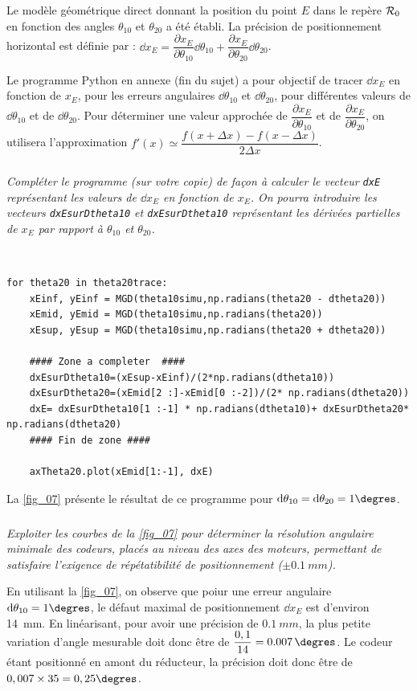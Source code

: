 \documentclass[10pt,fleqn]{article} %
\begin{document}
Le modèle géométrique direct donnant la position du point $E$ dans le repère $\mathcal{R}_{0}$  en fonction des angles $\theta_{10}$ et
$\theta_{20}$ a été établi. La précision de positionnement horizontal est définie par :
$\dd x_E = \dfrac{\partial x_E}{\partial \theta_{10}} \dd \theta_{10}
+ \dfrac{\partial x_E}{\partial \theta_{20}} \dd \theta_{20}$.


Le programme Python en annexe (fin du sujet) a pour objectif de tracer $\dd x_E$ en fonction de $x_E$, pour les erreurs angulaires $\dd \theta_{10}$ et $\dd \theta_{20}$, pour différentes valeurs de $\dd \theta_{10}$ et de $\dd \theta_{20}$.
Pour déterminer une valeur approchée de $\dfrac{\partial x_E}{\partial \theta_{10}}$
et de $\dfrac{\partial x_E}{\partial \theta_{20}}$, on utilisera l’approximation 
$f'\left(x\right)\simeq \dfrac{f\left(x+\Delta x\right)-f\left(x-\Delta x\right)}{2\Delta x}$.

\fi

\subparagraph{\label{q}}\textit{Compléter le programme (sur votre copie) de façon à calculer le vecteur \texttt{dxE} représentant les valeurs de $\dd x_E$ en fonction de $x_E$. On pourra introduire les vecteurs \texttt{dxEsurDtheta10} et \texttt{dxEsurDtheta10}
représentant les dérivées partielles de $x_E$ par rapport à $\theta_{10}$ et $\theta_{20}$.}
\ifprof
\begin{corrige}~\\

\begin{lstlisting}
for theta20 in theta20trace:
    xEinf, yEinf = MGD(theta10simu,np.radians(theta20 - dtheta20))
    xEmid, yEmid = MGD(theta10simu,np.radians(theta20))
    xEsup, yEsup = MGD(theta10simu,np.radians(theta20 + dtheta20))
    
    #### Zone a completer  ####
    dxEsurDtheta10=(xEsup-xEinf)/(2*np.radians(dtheta10))
    dxEsurDtheta20=(xEmid[2 :]-xEmid[0 :-2])/(2* np.radians(dtheta20))
    dxE= dxEsurDtheta10[1 :-1] * np.radians(dtheta10)+ dxEsurDtheta20* np.radians(dtheta20)
    #### Fin de zone ####
    
    axTheta20.plot(xEmid[1:-1], dxE)
\end{lstlisting}
\end{corrige}
\else
\fi

La \autoref{fig_07}  présente le résultat de ce programme pour $\dd \theta_{10} = \dd \theta_{20}=1\degres$.

\subparagraph{\label{q}}\textit{Exploiter les courbes de la \autoref{fig_07} pour déterminer la résolution angulaire minimale des codeurs, placés au niveau des axes des moteurs, permettant de satisfaire l’exigence de répétatibilité de positionnement ($\pm \SI{0,1}{mm}$).}
\ifprof
\begin{corrige}
En utilisant la \autoref{fig_07}, on observe que poiur une erreur angulaire $\dd \theta_{10}=1\degres$, le défaut maximal de positionnement $\dd x_E$ est d'environ \SI{14}{mm}. 
En linéarisant, pour avoir une précision de $\SI{0,1}{mm}$, la plus petite variation d'angle mesurable doit donc être de $\dfrac{0,1}{14}= \SI{0,007}{\degres}$. Le codeur  étant positionné en amont du réducteur, la précision doit donc être de $0,007\times 35 = 0,25\degres$.
\end{corrige}
\else
\fi
\end{document}
